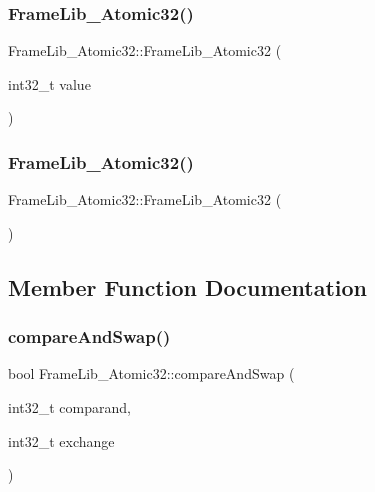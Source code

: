 \subsubsection{\texorpdfstring{Frame\+Lib\+\_\+\+Atomic32()}{FrameLib\_Atomic32()}\hspace{0.1cm}{\footnotesize\ttfamily [1/2]}}
{\footnotesize\ttfamily Frame\+Lib\+\_\+\+Atomic32\+::\+Frame\+Lib\+\_\+\+Atomic32 (\begin{DoxyParamCaption}\item[{int32\+\_\+t}]{value }\end{DoxyParamCaption})\hspace{0.3cm}{\ttfamily [inline]}}

\mbox{\label{class_frame_lib___atomic32_a6792ab371c313c18fa937e4c1f5d3ad6}} 
\subsubsection{\texorpdfstring{Frame\+Lib\+\_\+\+Atomic32()}{FrameLib\_Atomic32()}\hspace{0.1cm}{\footnotesize\ttfamily [2/2]}}
{\footnotesize\ttfamily Frame\+Lib\+\_\+\+Atomic32\+::\+Frame\+Lib\+\_\+\+Atomic32 (\begin{DoxyParamCaption}{ }\end{DoxyParamCaption})\hspace{0.3cm}{\ttfamily [inline]}}



\subsection{Member Function Documentation}
\mbox{\label{class_frame_lib___atomic32_aa3bc4a8674998a79479480fb9993e767}} 
\subsubsection{\texorpdfstring{compare\+And\+Swap()}{compareAndSwap()}}
{\footnotesize\ttfamily bool Frame\+Lib\+\_\+\+Atomic32\+::compare\+And\+Swap (\begin{DoxyParamCaption}\item[{int32\+\_\+t}]{comparand,  }\item[{int32\+\_\+t}]{exchange }\end{DoxyParamCaption})\hspace{0.3cm}{\ttfamily [inline]}}

